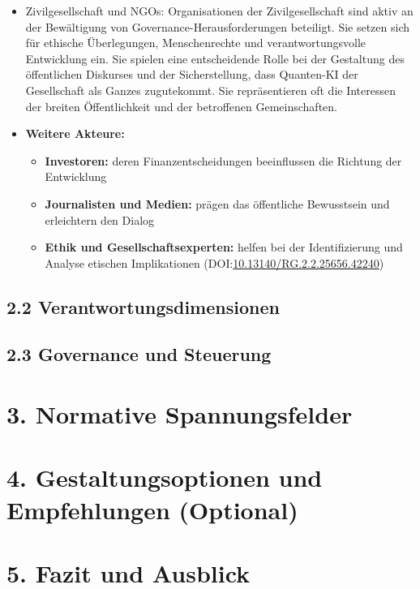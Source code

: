 \begin{itemize}
\begin{itemize}
    \end{itemize}
    \item Zivilgesellschaft und NGOs: Organisationen der Zivilgesellschaft sind aktiv an der Bewältigung von Governance-Herausforderungen beteiligt. Sie setzen sich für ethische Überlegungen, Menschenrechte und verantwortungsvolle Entwicklung ein. Sie spielen eine entscheidende Rolle bei der Gestaltung des öffentlichen Diskurses und der Sicherstellung, dass Quanten-KI der Gesellschaft als Ganzes zugutekommt. Sie repräsentieren oft die Interessen der breiten Öffentlichkeit und der betroffenen Gemeinschaften.
    \item \textbf{Weitere Akteure: }
    \begin{itemize}
        \item \textbf{Investoren:} deren Finanzentscheidungen beeinflussen die Richtung der Entwicklung
        \item \textbf{Journalisten und Medien:} prägen das öffentliche Bewusstsein und erleichtern den Dialog
        \item \textbf{Ethik und Gesellschaftsexperten: }helfen bei der Identifizierung und Analyse etischen Implikationen
\cite{Communities of Quantum Technologies: Stakeholder Identification, Legitimation, and Interaction}
(DOI:\href{http://dx.doi.org/10.13140/RG.2.2.25656.42240}{10.13140/RG.2.2.25656.42240})    \end{itemize}
\end{itemize}


\subsection{2.2 Verantwortungsdimensionen}


\subsection{2.3 Governance und Steuerung}



\section{3. Normative Spannungsfelder }

\section{4. Gestaltungsoptionen und Empfehlungen (Optional)}

\section{5. Fazit und Ausblick}





















